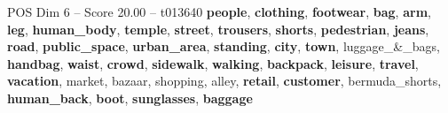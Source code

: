 \begin{textsample}{POS Dim 6 – Score 20.00 – t013640}  \label{ex:f6_pos_005}
\textbf{people}, \textbf{clothing}, \textbf{footwear}, \textbf{bag}, \textbf{arm}, \textbf{leg}, \textbf{human\_body}, \textbf{temple}, \textbf{street}, \textbf{trousers}, \textbf{shorts}, \textbf{pedestrian}, \textbf{jeans}, \textbf{road}, \textbf{public\_space}, \textbf{urban\_area}, \textbf{standing}, \textbf{city}, \textbf{town}, luggage\_\&\_bags, \textbf{handbag}, \textbf{waist}, \textbf{crowd}, \textbf{sidewalk}, \textbf{walking}, \textbf{backpack}, \textbf{leisure}, \textbf{travel}, \textbf{vacation}, market, bazaar, shopping, alley, \textbf{retail}, \textbf{customer}, bermuda\_shorts, \textbf{human\_back}, \textbf{boot}, \textbf{sunglasses}, \textbf{baggage}

\end{textsample}

